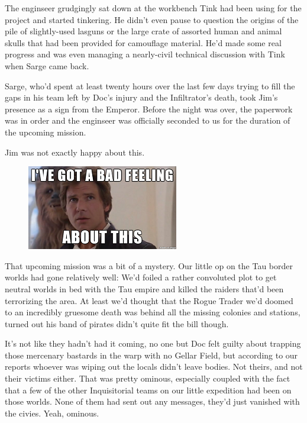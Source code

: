 The enginseer grudgingly sat down at the workbench Tink had been using for the project and started tinkering. 
He didn't even pause to question the origins of the pile of slightly-used lasguns or the large crate of assorted human and animal skulls that had been provided for camouflage material. 
He'd made some real progress and was even managing a nearly-civil technical discussion with Tink when Sarge came back.

Sarge, who'd spent at least twenty hours over the last few days trying to fill the gaps in his team left by Doc's injury and the Infiltrator's death, took Jim's presence as a sign from the Emperor. 
Before the night was over, the paperwork was in order and the enginseer was officially seconded to us for the duration of the upcoming mission.

Jim was not exactly happy about this.

\begin{figure}
	\begin{center}
		\includegraphics[width=\figwidth]{pics/11/7.png}
	\end{center}
\end{figure}
That upcoming mission was a bit of a mystery. 
Our little op on the Tau border worlds had gone relatively well: 
We'd foiled a rather convoluted plot to get neutral worlds in bed with the Tau empire and killed the raiders that'd been terrorizing the area. 
At least we'd thought that the Rogue Trader we'd doomed to an incredibly gruesome death was behind all the missing colonies and stations, turned out his band of pirates didn't quite fit the bill though. 


It's not like they hadn't had it coming, no one but Doc felt guilty about trapping those mercenary bastards in the warp with no Gellar Field, but according to our reports whoever was wiping out the locals didn't leave bodies. 
Not theirs, and not their victims either. 
That was pretty ominous, especially coupled with the fact that a few of the other Inquisitorial teams on our little expedition had been on those worlds. 
None of them had sent out any messages, they'd just vanished with the civies. 
Yeah, ominous.

